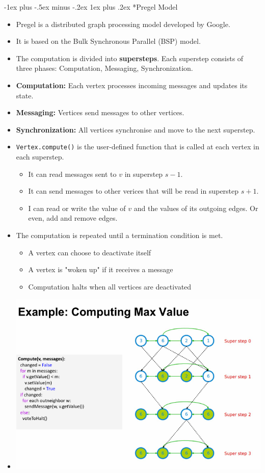 \documentclass[10pt, landscape]{article}
\makeatletter
\renewcommand{\subsubsection}{\@startsection{subsubsection}{3}{0mm}%
  {-1ex plus -.5ex minus -.2ex}%
  {1ex plus .2ex}%
{\normalfont\small\bfseries}}%
\makeatother
\begin{document}
\begin{multicols*}{4}
    \subsubsection*{Pregel Model}
    \begin{itemize}
      \item Pregel is a distributed graph processing model developed by Google.
      \item It is based on the Bulk Synchronous Parallel (BSP) model.
      \item The computation is divided into \textbf{supersteps}. Each superstep consists of three phases: Computation, Messaging, Synchronization.
      \item \textbf{Computation:} Each vertex processes incoming messages and updates its state.
      \item \textbf{Messaging:} Vertices send messages to other vertices.
      \item \textbf{Synchronization:} All vertices synchronise and move to the next superstep.
      \item \texttt{Vertex.compute()} is the user-defined function that is called at each vertex in each superstep.
            \begin{itemize}
              \item It can read messages sent to $v$ in superstep $s - 1$.
              \item It can send messages to other verices that will be read in superstep $s + 1$.
              \item I can read or write the value of $v$ and the values of its outgoing edges. Or even, add and remove edges.
            \end{itemize}
      \item The computation is repeated until a termination condition is met.
            \begin{itemize}
              \item A vertex can choose to deactivate itself
              \item A vertex is "woken up" if it receives a message
              \item Computation halts when all vertices are deactivated
            \end{itemize}
      \item \includegraphics*[width=0.95\linewidth]{pregel_count_max.png}

\end{itemize}
\end{multicols*}
\end{document}
